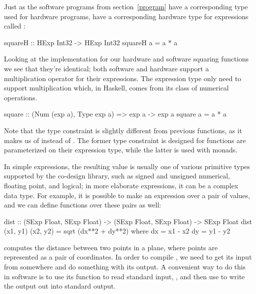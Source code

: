 \documentclass[../main.tex]{subfiles}
\begin{document}
Just as the software programs from section~\ref{program} have a corresponding type used for hardware programs,  have a corresponding hardware type for expressions called :


\begin{stub}
squareH :: HExp Int32 -> HExp Int32
squareH a = a * a
\end{stub}

Looking at the implementation for our hardware and software squaring functions we see that they're identical; both software and hardware support a multiplication operator for their expressions. The expression type only need to support multiplication which, in Haskell, comes from its  class of numerical operations.


\begin{code}
square :: (Num (exp a), Type exp a) => exp a -> exp a
square a = a * a
\end{code}

\noindent Note that the type constraint is slightly different from previous functions, as it makes us of  instead of . The former type constraint is designed for functions are parameterized on their expression type, while the latter is used with monads.

In simple expressions, the resulting value is usually one of various primitive types supported by the co-design library, such as signed and unsigned numerical, floating point, and logical; in more elaborate expressions, it can be a complex data type. For example, it is possible to make an expression over a pair of values, and we can define functions over these pairs as well:

\begin{code}
dist :: (SExp Float, SExp Float) -> (SExp Float, SExp Float) -> SExp Float
dist (x1, y1) (x2, y2) = sqrt (dx**2 + dy**2)
  where
    dx = x1 - x2
    dy = y1 - y2
\end{code}

\noindent {} computes the distance between two points in a plane, where points are represented as a pair of coordinates. In order to compile , we need to get its input from somewhere and do something with its output. A convenient way to do this in software is to use its  function to read standard input, , and then use  to write the output out into standard output.
\end{document}
